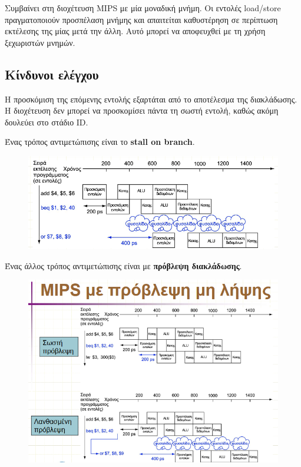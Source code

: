 \documentclass[11pt, oneside]{article}   	%
\begin{document}
Συμβαίνει στη διοχέτευση MIPS με μία μοναδική μνήμη. Οι εντολές load/store πραγματοποιούν προσπέλαση μνήμης και απαιτείται καθυστέρηση σε περίπτωση εκτέλεσης της μίας μετά την άλλη. Αυτό μπορεί να αποφευχθεί με τη χρήση ξεχωριστών μνημών.

\newpage

\subsection{Κίνδυνοι ελέγχου}

Η προσκόμιση της επόμενης εντολής εξαρτάται από το αποτέλεσμα της διακλάδωσης.
Η διοχέτευση δεν μπορεί να προσκομίσει πάντα τη σωστή εντολή, καθώς ακόμη δουλεύει στο στάδιο ID.

Ένας τρόπος αντιμετώπισης είναι το \textbf{stall on branch}.

\begin{figure}[h!]
	\centering
	\includegraphics[width=0.7\linewidth]{"Computer Architecture 2/screenshot005"}
	\caption{}
	\label{fig:screenshot005}
\end{figure}

Ένας άλλος τρόπος αντιμετώπισης είναι με \textbf{πρόβλεψη διακλάδωσης}.

\begin{figure}[h!]
	\centering
	\includegraphics[width=0.7\linewidth]{"Computer Architecture 2/screenshot006"}
	\caption{}
	\label{fig:screenshot006}
\end{figure}
\end{document}
